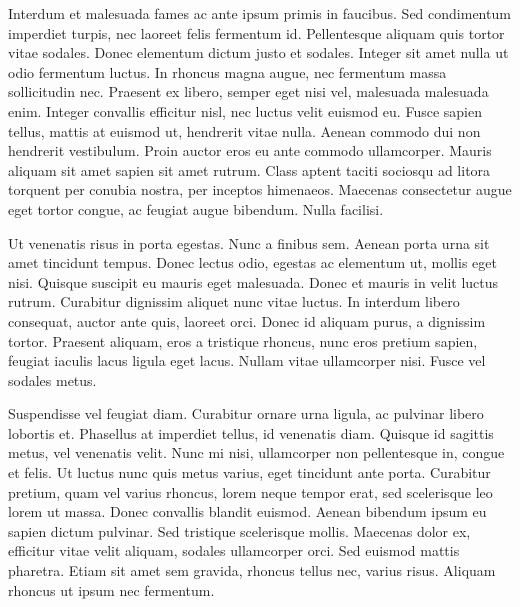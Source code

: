 \documentclass{book}
\begin{document}
            Interdum et malesuada fames ac ante ipsum primis in faucibus. Sed condimentum
               imperdiet turpis, nec laoreet felis fermentum id. Pellentesque aliquam quis tortor
               vitae sodales. Donec elementum dictum justo et sodales. Integer sit amet nulla ut
               odio fermentum luctus. In rhoncus magna augue, nec fermentum massa sollicitudin nec.
               Praesent ex libero, semper eget nisi vel, malesuada malesuada enim. Integer convallis
               efficitur nisl, nec luctus velit euismod eu. Fusce sapien tellus, mattis at euismod
               ut, hendrerit vitae nulla. Aenean commodo dui non hendrerit vestibulum. Proin auctor
               eros eu ante commodo ullamcorper. Mauris aliquam sit amet sapien sit amet rutrum.
               Class aptent taciti sociosqu ad litora torquent per conubia nostra, per inceptos
               himenaeos. Maecenas consectetur augue eget tortor congue, ac feugiat augue bibendum.
               Nulla facilisi.
            
            Ut venenatis risus in porta egestas. Nunc a finibus sem. Aenean porta urna sit amet
               tincidunt tempus. Donec lectus odio, egestas ac elementum ut, mollis eget nisi.
               Quisque suscipit eu mauris eget malesuada. Donec et mauris in velit luctus rutrum.
               Curabitur dignissim aliquet nunc vitae luctus. In interdum libero consequat, auctor
               ante quis, laoreet orci. Donec id aliquam purus, a dignissim tortor. Praesent
               aliquam, eros a tristique rhoncus, nunc eros pretium sapien, feugiat iaculis lacus
               ligula eget lacus. Nullam vitae ullamcorper nisi. Fusce vel sodales metus.
            
            Suspendisse vel feugiat diam. Curabitur ornare urna ligula, ac pulvinar libero
               lobortis et. Phasellus at imperdiet tellus, id venenatis diam. Quisque id sagittis
               metus, vel venenatis velit. Nunc mi nisi, ullamcorper non pellentesque in, congue et
               felis. Ut luctus nunc quis metus varius, eget tincidunt ante porta. Curabitur
               pretium, quam vel varius rhoncus, lorem neque tempor erat, sed scelerisque leo lorem
               ut massa. Donec convallis blandit euismod. Aenean bibendum ipsum eu sapien dictum
               pulvinar. Sed tristique scelerisque mollis. Maecenas dolor ex, efficitur vitae velit
               aliquam, sodales ullamcorper orci. Sed euismod mattis pharetra. Etiam sit amet sem
               gravida, rhoncus tellus nec, varius risus. Aliquam rhoncus ut ipsum nec
               fermentum.
            
\end{document}

